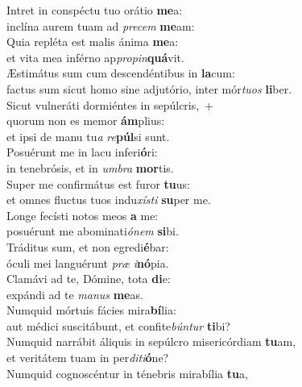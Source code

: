 \evenverse Intret in conspéctu tuo orátio \textbf{me}a:~\*\\
\evenverse inclína aurem tuam ad \textit{pre}\textit{cem} \textbf{me}am:\\
\oddverse Quia repléta est malis ánima \textbf{me}a:~\*\\
\oddverse et vita mea inférno ap\textit{pro}\textit{pin}\textbf{quá}vit.\\
\evenverse Æstimátus sum cum descendéntibus in \textbf{la}cum:~\*\\
\evenverse factus sum sicut homo sine adjutório, inter mór\textit{tu}\textit{os} \textbf{li}ber.\\
\oddverse Sicut vulneráti dormiéntes in sepúlcris,~+\\
\oddverse  quorum non es memor \textbf{ám}plius:~\*\\
\oddverse et ipsi de manu tu\textit{a} \textit{re}\textbf{púl}si sunt.\\
\evenverse Posuérunt me in lacu inferi\textbf{ó}ri:~\*\\
\evenverse in tenebrósis, et in \textit{um}\textit{bra} \textbf{mor}tis.\\
\oddverse Super me confirmátus est furor \textbf{tu}us:~\*\\
\oddverse et omnes fluctus tuos indu\textit{xí}\textit{sti} \textbf{su}per me.\\
\evenverse Longe fecísti notos meos \textbf{a} me:~\*\\
\evenverse posuérunt me abominati\textit{ó}\textit{nem} \textbf{si}bi.\\
\oddverse Tráditus sum, et non egredi\textbf{é}bar:~\*\\
\oddverse óculi mei languérunt \textit{præ} \textit{i}\textbf{nó}pia.\\
\evenverse Clamávi ad te, Dómine, tota \textbf{di}e:~\*\\
\evenverse expándi ad te \textit{ma}\textit{nus} \textbf{me}as.\\
\oddverse Numquid mórtuis fácies mira\textbf{bí}lia:~\*\\
\oddverse aut médici suscitábunt, et confite\textit{bún}\textit{tur} \textbf{ti}bi?\\
\evenverse Numquid narrábit áliquis in sepúlcro misericórdiam \textbf{tu}am,~\*\\
\evenverse et veritátem tuam in per\textit{di}\textit{ti}\textbf{ó}ne?\\
\oddverse Numquid cognoscéntur in ténebris mirabília \textbf{tu}a,~\*\\
